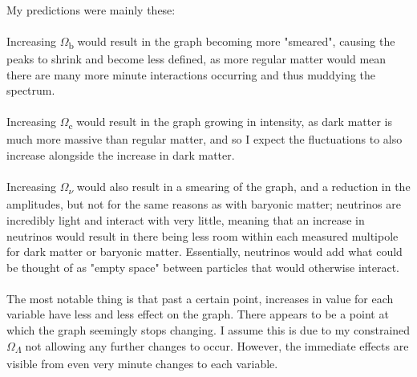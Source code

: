 \documentclass[twoside, fontsize=12pt,
     bibliography=totoc, %
     listof=totoc, %
     index=totoc, %
     onehalfspacing %
]{_MScDiss2017_cls}
\begin{document}
\paragraph{}

My predictions were mainly these:
\paragraph{}
Increasing $\Omega$\textsubscript{b} would result in the graph becoming more "smeared", causing the peaks to shrink and become less defined, as more regular matter would mean there are many more minute interactions occurring and thus muddying the spectrum.
\paragraph{}
Increasing $\Omega$\textsubscript{c} would result in the graph growing in intensity, as dark matter is much more massive than regular matter, and so I expect the fluctuations to also increase alongside the increase in dark matter.
\paragraph{}
Increasing $\Omega$\textsubscript{$\nu$} would also result in a smearing of the graph, and a reduction in the amplitudes, but not for the same reasons as with baryonic matter; neutrinos are incredibly light and interact with very little, meaning that an increase in neutrinos would result in there being less room within each measured multipole for dark  matter or baryonic matter. Essentially, neutrinos would add what could be thought of as "empty space" between particles that would otherwise interact.

\paragraph{}

The most notable thing is that past a certain point, increases in value for each variable have less and less effect on the graph. There appears to be a point at which the graph seemingly stops changing. I assume this is due to my constrained $\Omega$\textsubscript{$\Lambda$} not allowing any further changes to occur. However, the immediate effects are visible from even very minute changes to each variable.
\end{document}
